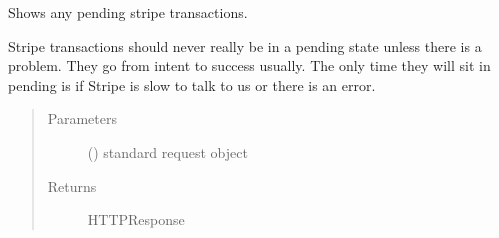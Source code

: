 \documentclass[letterpaper,10pt,english]{sphinxmanual}
\begin{document}

\begin{fulllineitems}
\label{\detokenize{payments:payments.views.stripe_pending}}
Shows any pending stripe transactions.

Stripe transactions should never really be in a pending state unless
there is a problem. They go from intent to success usually. The only time
they will sit in pending is if Stripe is slow to talk to us or there is an
error.
\begin{quote}\begin{description}
\item[{Parameters}] \leavevmode
{} () \textendash{} standard request object

\item[{Returns}] \leavevmode
HTTPResponse

\end{description}\end{quote}

\end{fulllineitems}

\end{document}

